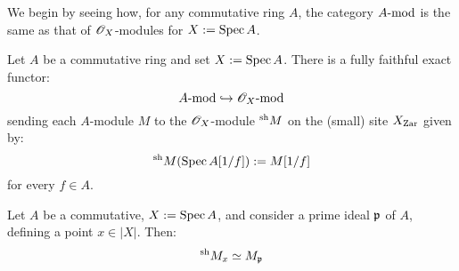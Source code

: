         We begin by seeing how, for any commutative ring $A$, the category $A\mod$ is the same as that of $\scrO_X$-modules for $X := \Spec A$. 
        \begin{lemma} \label{lemma: sheafifying_modules}
            Let $A$ be a commutative ring and set $X := \Spec A$. There is a fully faithful exact functor:
                $$A\mod \hookrightarrow \scrO_X\mod$$
            sending each $A$-module $M$ to the $\scrO_X$-module ${}^{\sh}M$ on the (small) site $X_{\Zar}$ given by:
                $${}^{\sh}M(\Spec A[1/f]) := M[1/f]$$
            for every $f \in A$. 
        \end{lemma}
        \begin{corollary}
            Let $A$ be a commutative, $X := \Spec A$, and consider a prime ideal $\p$ of $A$, defining a point $x \in |X|$. Then:
                $${}^{\sh}M_x \cong M_{\p}$$
        \end{corollary}
        

